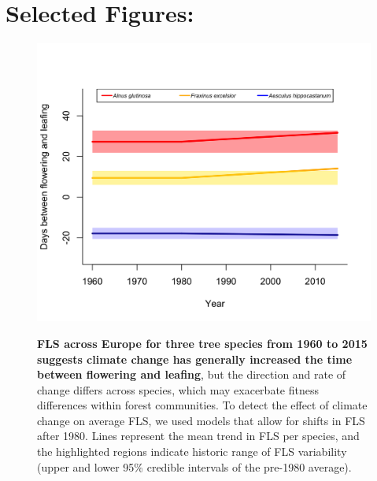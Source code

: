 \documentclass[11pt,a4paper]{article}
\begin{document}
\section*{Selected Figures:}
   \begin{figure}[ht!]
   \centering
 \includegraphics[width=.9\textwidth]{..//figure/FLS_climate_change.png}\\
\caption{\textbf{FLS across Europe for three tree species from 1960 to 2015 suggests climate change has generally increased the time between flowering and leafing}, but the direction and rate of change differs across species, which may exacerbate fitness differences within forest communities. To detect the effect of climate change on average FLS, we used models that allow for shifts in FLS after 1980. Lines represent the mean trend in FLS per species, and the highlighted regions indicate historic range of FLS variability (upper and lower 95\% credible intervals of the pre-1980 average).}
    \label{fig:Figure 1}
    \end{figure}
\newpage

\end{document}
